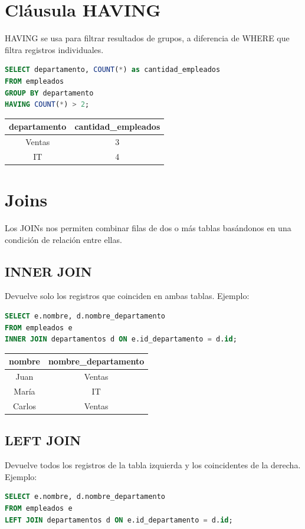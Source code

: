 \documentclass[12pt]{article}
\begin{document}
\section{Cláusula HAVING}
HAVING se usa para filtrar resultados de grupos, a diferencia de WHERE que filtra registros individuales.

\begin{lstlisting}[language=SQL]
SELECT departamento, COUNT(*) as cantidad_empleados
FROM empleados
GROUP BY departamento
HAVING COUNT(*) > 2;
\end{lstlisting}

\begin{center}
\begin{tabular}{cc}
\toprule
departamento & cantidad\_empleados \\
\midrule
Ventas & 3 \\
IT & 4 \\
\bottomrule
\end{tabular}
\end{center}

\section{Joins}
Los JOINs nos permiten combinar filas de dos o más tablas basándonos en una condición de relación entre ellas.

\subsection{INNER JOIN}
Devuelve solo los registros que coinciden en ambas tablas. Ejemplo:
\begin{lstlisting}[language=SQL]
SELECT e.nombre, d.nombre_departamento
FROM empleados e
INNER JOIN departamentos d ON e.id_departamento = d.id;
\end{lstlisting}

\begin{center}
\begin{tabular}{cc}
\toprule
nombre & nombre\_departamento \\
\midrule
Juan & Ventas \\
María & IT \\
Carlos & Ventas \\
\bottomrule
\end{tabular}
\end{center}

\subsection{LEFT JOIN}
Devuelve todos los registros de la tabla izquierda y los coincidentes de la derecha. Ejemplo:
\begin{lstlisting}[language=SQL]
SELECT e.nombre, d.nombre_departamento
FROM empleados e
LEFT JOIN departamentos d ON e.id_departamento = d.id;
\end{lstlisting}
\end{document}
